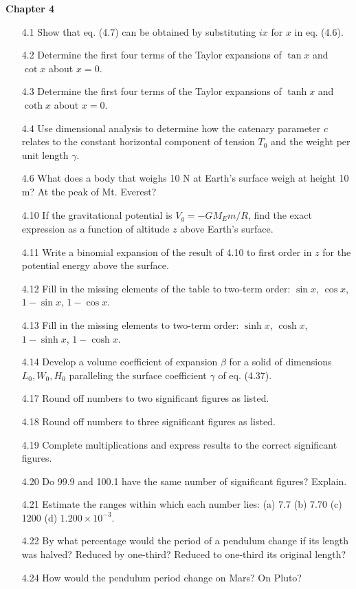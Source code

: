 \textbf{Chapter 4}
\begin{enumerate}
  \item[4.1] Show that eq. (4.7) can be obtained by substituting $ix$ for $x$ in eq. (4.6).
  \item[4.2] Determine the first four terms of the Taylor expansions of $\tan x$ and $\cot x$ about $x=0$.
  \item[4.3] Determine the first four terms of the Taylor expansions of $\tanh x$ and $\coth x$ about $x=0$.
  \item[4.4] Use dimensional analysis to determine how the catenary parameter $c$ relates to the constant horizontal component of tension $T_0$ and the weight per unit length $\gamma$.
  \item[4.6] What does a body that weighs 10 N at Earth's surface weigh at height 10 m? At the peak of Mt. Everest?
  \item[4.10] If the gravitational potential is $V_g = -G M_E m / R$, find the exact expression as a function of altitude $z$ above Earth's surface.
  \item[4.11] Write a binomial expansion of the result of 4.10 to first order in $z$ for the potential energy above the surface.
  \item[4.12] Fill in the missing elements of the table to two-term order: $\sin x$, $\cos x$, $1-\sin x$, $1-\cos x$.
  \item[4.13] Fill in the missing elements to two-term order: $\sinh x$, $\cosh x$, $1-\sinh x$, $1-\cosh x$.
  \item[4.14] Develop a volume coefficient of expansion $\beta$ for a solid of dimensions $L_0,W_0,H_0$ paralleling the surface coefficient $\gamma$ of eq. (4.37).
  \item[4.17] Round off numbers to two significant figures as listed.
  \item[4.18] Round off numbers to three significant figures as listed.
  \item[4.19] Complete multiplications and express results to the correct significant figures.
  \item[4.20] Do 99.9 and 100.1 have the same number of significant figures? Explain.
  \item[4.21] Estimate the ranges within which each number lies: (a) 7.7 (b) 7.70 (c) 1200 (d) $1.200\times10^{-3}$.
  \item[4.22] By what percentage would the period of a pendulum change if its length was halved? Reduced by one-third? Reduced to one-third its original length?
  \item[4.24] How would the pendulum period change on Mars? On Pluto?

\end{enumerate}
